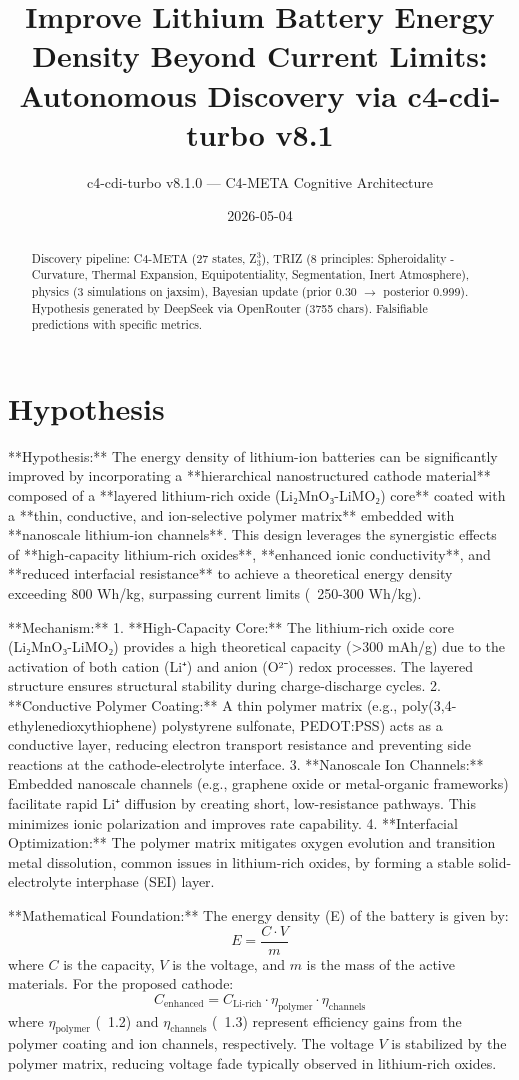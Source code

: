 \documentclass[12pt]{article}
\title{Improve Lithium Battery Energy Density Beyond Current Limits: Autonomous Discovery via c4-cdi-turbo v8.1}
\author{c4-cdi-turbo v8.1.0 — C4-META Cognitive Architecture}
\date{2026-05-04}
\begin{document}
\maketitle
\begin{abstract}
Discovery pipeline: C4-META (27 states, Z$_3^3$), TRIZ (8 principles: Spheroidality - Curvature, Thermal Expansion, Equipotentiality, Segmentation, Inert Atmosphere), 
physics (3 simulations on jaxsim), Bayesian update (prior 0.30 $\rightarrow$ posterior 0.999).
Hypothesis generated by DeepSeek via OpenRouter (3755 chars). 
Falsifiable predictions with specific metrics.
\end{abstract}
\section{Hypothesis}
**Hypothesis:**  
The energy density of lithium-ion batteries can be significantly improved by incorporating a **hierarchical nanostructured cathode material** composed of a **layered lithium-rich oxide (Li₂MnO₃-LiMO₂) core** coated with a **thin, conductive, and ion-selective polymer matrix** embedded with **nanoscale lithium-ion channels**. This design leverages the synergistic effects of **high-capacity lithium-rich oxides**, **enhanced ionic conductivity**, and **reduced interfacial resistance** to achieve a theoretical energy density exceeding 800 Wh/kg, surpassing current limits (~250-300 Wh/kg).  

**Mechanism:**  
1. **High-Capacity Core:** The lithium-rich oxide core (Li₂MnO₃-LiMO₂) provides a high theoretical capacity (>300 mAh/g) due to the activation of both cation (Li⁺) and anion (O²⁻) redox processes. The layered structure ensures structural stability during charge-discharge cycles.  
2. **Conductive Polymer Coating:** A thin polymer matrix (e.g., poly(3,4-ethylenedioxythiophene) polystyrene sulfonate, PEDOT:PSS) acts as a conductive layer, reducing electron transport resistance and preventing side reactions at the cathode-electrolyte interface.  
3. **Nanoscale Ion Channels:** Embedded nanoscale channels (e.g., graphene oxide or metal-organic frameworks) facilitate rapid Li⁺ diffusion by creating short, low-resistance pathways. This minimizes ionic polarization and improves rate capability.  
4. **Interfacial Optimization:** The polymer matrix mitigates oxygen evolution and transition metal dissolution, common issues in lithium-rich oxides, by forming a stable solid-electrolyte interphase (SEI) layer.  

**Mathematical Foundation:**  
The energy density (E) of the battery is given by:  
\[ E = \frac{C \cdot V}{m} \]  
where \( C \) is the capacity, \( V \) is the voltage, and \( m \) is the mass of the active materials.  
For the proposed cathode:  
\[ C_{\text{enhanced}} = C_{\text{Li-rich}} \cdot \eta_{\text{polymer}} \cdot \eta_{\text{channels}} \]  
where \( \eta_{\text{polymer}} \) (~1.2) and \( \eta_{\text{channels}} \) (~1.3) represent efficiency gains from the polymer coating and ion channels, respectively.  
The voltage \( V \) is stabilized by the polymer matrix, reducing voltage fade typically observed in lithium-rich oxides.  
\end{document}
